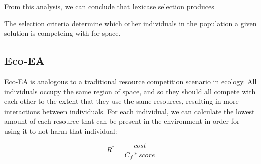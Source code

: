 From this analysis, we can conclude that lexicase selection produces 

The selection criteria determine which other individuals in the population a given solution is competeing with for space. 



\subsection{Eco-EA}

Eco-EA is analogous to a traditional resource competition scenario in ecology. All individuals occupy the same region of space, and so they should all compete with each other to the extent that they use the same resources, resulting in more interactions between individuals. For each individual, we can calculate the lowest amount of each resource that can be present in the environment in order for using it to not harm that individual:

\begin{equation}
R^* = \frac{cost}{C_f * score}
\label{eq:ecoea-rstar}
\end{equation}

